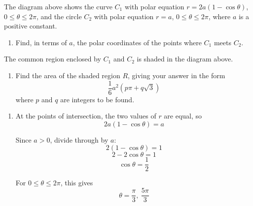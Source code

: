 \documentclass[leqno]{article}
\begin{document}
\begin{enumerate}[
	  label=\textbf{\arabic*.},
	  leftmargin=*,
	  topsep=0pt,
	  partopsep=0pt,
	  parsep=0pt
	]
\begin{figure}[H]
\end{figure}


The diagram above shows the curve $C_1$ with polar equation $r=2a(1-\cos\theta)$, $0\leq\theta\leq2\pi$, and the circle $C_2$ with polar equation $r=a$, $0\leq\theta\leq2\pi$, where $a$ is a positive constant. \\
\begin{enumerate}[label=\textbf{(\alph*)}]
  \item Find, in terms of $a$, the polar coordinates of the points where $C_1$ meets $C_2$.  \\
\end{enumerate}
The common region enclosed by $C_1$ and $C_2$ is shaded in the diagram above. \\
\begin{enumerate}[label=\textbf{(\alph*)}, resume]
  \item Find the area of the shaded region $R$, giving your answer in the form
  \[
  \frac{1}{6}a^2\left(p\pi+q\sqrt{3}\right)
  \]
  where $p$ and $q$ are integers to be found.  \\
\end{enumerate}

	\vspace*{10pt}
	
	\begin{djsSolution}
	\begin{enumerate}[label=\textbf{(\alph*)}]
	  \item At the points of intersection, the two values of $r$ are equal, so
	\[
	2a(1-\cos\theta)=a
	\]

	Since $a>0$, divide through by $a$:
	\[
	2(1-\cos\theta)=1
	\]
	\[
	2-2\cos\theta=1
	\]
	\[
	\cos\theta=\frac12
	\]

	For $0\le \theta\le 2\pi$, this gives
	\[
	\theta=\frac{\pi}{3},\ \frac{5\pi}{3}
	\]


\end{enumerate}
\end{djsSolution}
\end{enumerate}
\end{document}
